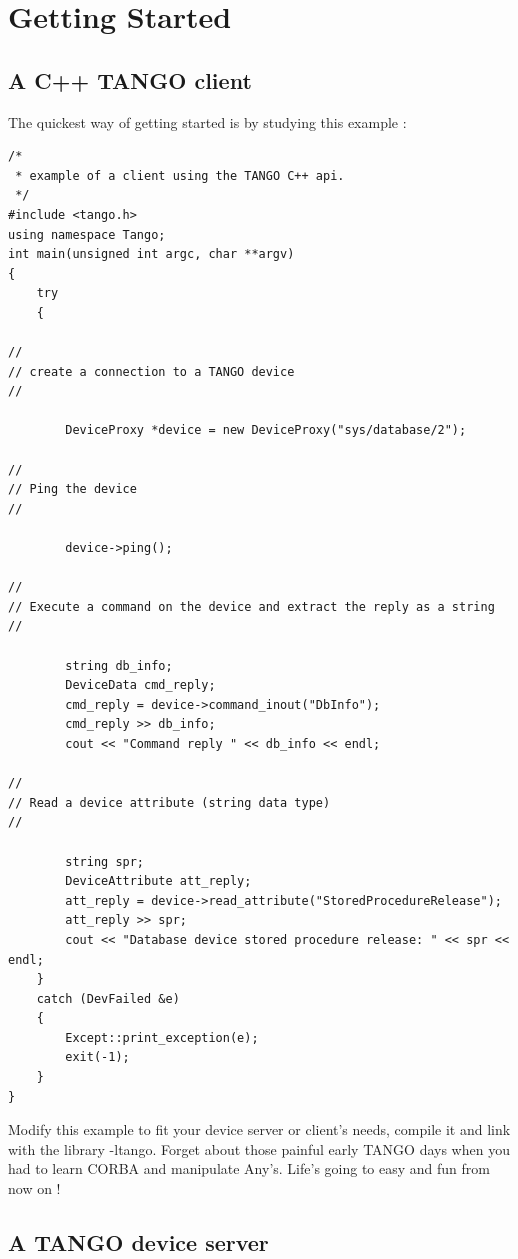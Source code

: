 
\chapter{Getting Started}


\section{A C++ TANGO client}

\noindent The quickest way of getting started is by studying this
example :


\begin{verbatim}
/* 
 * example of a client using the TANGO C++ api.
 */
#include <tango.h>
using namespace Tango;
int main(unsigned int argc, char **argv)
{
    try
    {

//
// create a connection to a TANGO device
//
 
        DeviceProxy *device = new DeviceProxy("sys/database/2");
 
//
// Ping the device
//
 
        device->ping();
 
//
// Execute a command on the device and extract the reply as a string
//
 
        string db_info; 
        DeviceData cmd_reply;
        cmd_reply = device->command_inout("DbInfo");
        cmd_reply >> db_info;
        cout << "Command reply " << db_info << endl;
 
//
// Read a device attribute (string data type)
//
 
        string spr;
        DeviceAttribute att_reply;
        att_reply = device->read_attribute("StoredProcedureRelease");
        att_reply >> spr;
        cout << "Database device stored procedure release: " << spr << endl;
    }
    catch (DevFailed &e)
    {
        Except::print_exception(e);
        exit(-1);
    } 
}
\end{verbatim}


\noindent Modify this example to fit your device server or client's
needs, compile it and link with the library -ltango. Forget about
those painful early TANGO days when you had to learn CORBA and manipulate
Any's. Life's going to easy and fun from now on !


\section{A TANGO device server}

